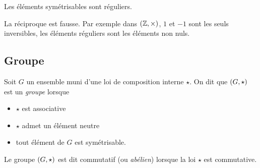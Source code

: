 \documentclass{magnolia}
\begin{document}
\begin{proposition}
Les éléments symétrisables sont réguliers.  
\end{proposition}


\begin{sol} La réciproque est fausse. Par exemple dans $(\mathbb{Z},\times)$, $1$ et $-1$ sont les seuls inversibles, les éléments réguliers sont les éléments non nuls.
\end{sol}


\subsection{Groupe}

\begin{definition}
Soit $G$ un ensemble muni d'une loi de composition interne $\star$. On  dit que
$\left(G,\star\right)$ est un \emph{groupe} lorsque
\begin{itemize}
\item $\star$ est associative
\item $\star$ admet un élément neutre
\item tout élément de $G$ est symétrisable.
\end{itemize}
Le groupe $\left(G,\star\right)$ est dit commutatif (ou \emph{abélien}) lorsque la loi $\star$
est commutative.
\end{definition}
\end{document}
